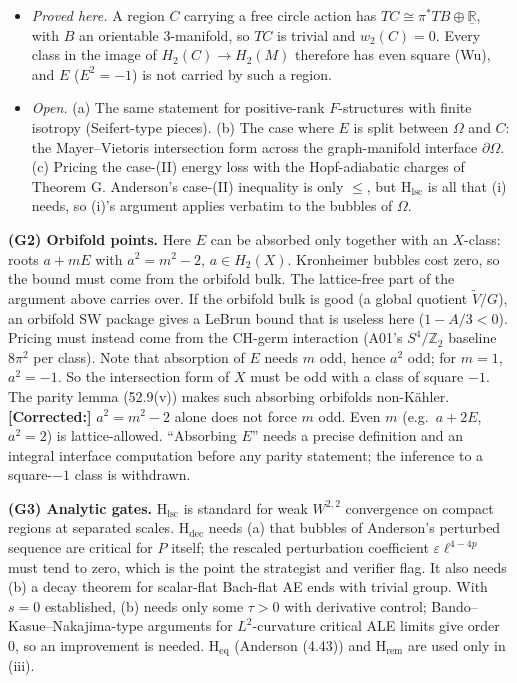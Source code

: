 \documentclass[
  10pt,
]{report}
\providecommand{\tightlist}{%
  \setlength{\itemsep}{0pt}\setlength{\parskip}{0pt}}
\begin{document}
\begin{itemize}
\tightlist
\item
  \emph{Proved here.} A region \(C\) carrying a free circle action has
  \(TC\cong\pi^*TB\oplus\underline{\mathbb R}\), with \(B\) an
  orientable 3-manifold, so \(TC\) is trivial and \(w_2(C)=0\). Every
  class in the image of \(H_2(C)\to H_2(M)\) therefore has even square
  (Wu), and \(E\) (\(E^2=-1\)) is not carried by such a region.
\item
  \emph{Open.} (a) The same statement for positive-rank \(F\)-structures
  with finite isotropy (Seifert-type pieces). (b) The case where \(E\)
  is split between \(\Omega\) and \(C\): the Mayer--Vietoris
  intersection form across the graph-manifold interface
  \(\partial\Omega\). (c) Pricing the case-(II) energy loss with the
  Hopf-adiabatic charges of Theorem G. Anderson's case-(II) inequality
  is only \(\le\), but \(\mathrm{H_{lsc}}\) is all that (i) needs, so
  (i)'s argument applies verbatim to the bubbles of \(\Omega\).
\end{itemize}

\textbf{(G2) Orbifold points.} Here \(E\) can be absorbed only together
with an \(X\)-class: roots \(a+mE\) with \(a^2=m^2-2\), \(a\in H_2(X)\).
Kronheimer bubbles cost zero, so the bound must come from the orbifold
bulk. The lattice-free part of the argument above carries over. If the
orbifold bulk is good (a global quotient \(\tilde V/G\)), an orbifold SW
package gives a LeBrun bound that is useless here (\(1-A/3<0\)). Pricing
must instead come from the CH-germ interaction (A01's
\(S^4/\mathbb Z_2\) baseline \(8\pi^2\) per class). Note that absorption
of \(E\) needs \(m\) odd, hence \(a^2\) odd; for \(m=1\), \(a^2=-1\). So
the intersection form of \(X\) must be odd with a class of square
\(-1\). The parity lemma (52.9(v)) makes such absorbing orbifolds
non-Kähler. \textbf{{[}Corrected:{]}} \(a^2=m^2-2\) alone does not force
\(m\) odd. Even \(m\) (e.g.~\(a+2E\), \(a^2=2\)) is lattice-allowed.
``Absorbing \(E\)'' needs a precise definition and an integral interface
computation before any parity statement; the inference to a
square-\(-1\) class is withdrawn.

\textbf{(G3) Analytic gates.} \(\mathrm{H_{lsc}}\) is standard for weak
\(W^{2,2}\) convergence on compact regions at separated scales.
\(\mathrm{H_{dec}}\) needs (a) that bubbles of Anderson's perturbed
sequence are critical for \(P\) itself; the rescaled perturbation
coefficient \(\varepsilon\ell^{4-4p}\) must tend to zero, which is the
point the strategist and verifier flag. It also needs (b) a decay
theorem for scalar-flat Bach-flat AE ends with trivial group. With
\(s=0\) established, (b) needs only some \(\tau>0\) with derivative
control; Bando--Kasue--Nakajima-type arguments for \(L^2\)-curvature
critical ALE limits give order 0, so an improvement is needed.
\(\mathrm{H_{eq}}\) (Anderson (4.43)) and \(\mathrm{H_{rem}}\) are used
only in (iii).
\end{document}
